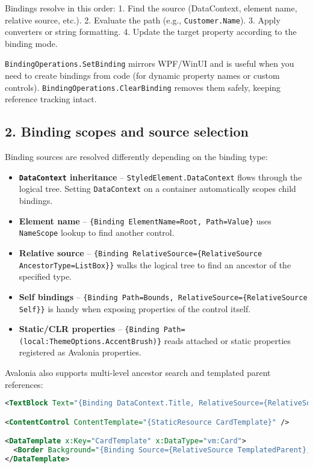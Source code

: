 Bindings resolve in this order: 1. Find the source (DataContext, element
name, relative source, etc.). 2. Evaluate the path (e.g.,
\passthrough{\lstinline!Customer.Name!}). 3. Apply converters or string
formatting. 4. Update the target property according to the binding mode.

\passthrough{\lstinline!BindingOperations.SetBinding!} mirrors WPF/WinUI
and is useful when you need to create bindings from code (for dynamic
property names or custom controls).
\passthrough{\lstinline!BindingOperations.ClearBinding!} removes them
safely, keeping reference tracking intact.

\subsection{2. Binding scopes and source
selection}\label{binding-scopes-and-source-selection}

Binding sources are resolved differently depending on the binding type:

\begin{itemize}
\tightlist
\item
  \textbf{\passthrough{\lstinline!DataContext!} inheritance} --
  \passthrough{\lstinline!StyledElement.DataContext!} flows through the
  logical tree. Setting \passthrough{\lstinline!DataContext!} on a
  container automatically scopes child bindings.
\item
  \textbf{Element name} --
  \passthrough{\lstinline!\{Binding ElementName=Root, Path=Value\}!}
  uses \passthrough{\lstinline!NameScope!} lookup to find another
  control.
\item
  \textbf{Relative source} --
  \passthrough{\lstinline!\{Binding RelativeSource=\{RelativeSource AncestorType=ListBox\}\}!}
  walks the logical tree to find an ancestor of the specified type.
\item
  \textbf{Self bindings} --
  \passthrough{\lstinline!\{Binding Path=Bounds, RelativeSource=\{RelativeSource Self\}\}!}
  is handy when exposing properties of the control itself.
\item
  \textbf{Static/CLR properties} --
  \passthrough{\lstinline!\{Binding Path=(local:ThemeOptions.AccentBrush)\}!}
  reads attached or static properties registered as Avalonia properties.
\end{itemize}

Avalonia also supports multi-level ancestor search and templated parent
references:

\begin{lstlisting}[language=XML]
<TextBlock Text="{Binding DataContext.Title, RelativeSource={RelativeSource AncestorType=Window}}"/>

<ContentControl ContentTemplate="{StaticResource CardTemplate}" />

<DataTemplate x:Key="CardTemplate" x:DataType="vm:Card">
  <Border Background="{Binding Source={RelativeSource TemplatedParent}, Path=Background}"/>
</DataTemplate>
\end{lstlisting}

